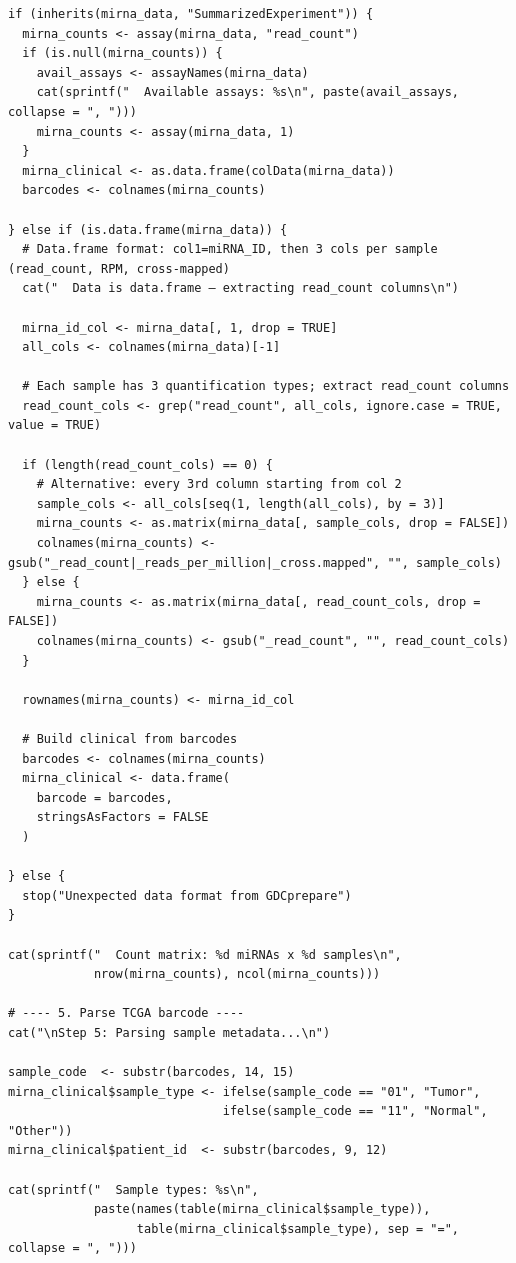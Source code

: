 \documentclass[12pt,a4paper]{ctexart}
\begin{document}
\begin{lstlisting}[caption={02_download_mirna}, basicstyle=\ttfamily\scriptsize]
if (inherits(mirna_data, "SummarizedExperiment")) {
  mirna_counts <- assay(mirna_data, "read_count")
  if (is.null(mirna_counts)) {
    avail_assays <- assayNames(mirna_data)
    cat(sprintf("  Available assays: %s\n", paste(avail_assays, collapse = ", ")))
    mirna_counts <- assay(mirna_data, 1)
  }
  mirna_clinical <- as.data.frame(colData(mirna_data))
  barcodes <- colnames(mirna_counts)

} else if (is.data.frame(mirna_data)) {
  # Data.frame format: col1=miRNA_ID, then 3 cols per sample (read_count, RPM, cross-mapped)
  cat("  Data is data.frame — extracting read_count columns\n")

  mirna_id_col <- mirna_data[, 1, drop = TRUE]
  all_cols <- colnames(mirna_data)[-1]

  # Each sample has 3 quantification types; extract read_count columns
  read_count_cols <- grep("read_count", all_cols, ignore.case = TRUE, value = TRUE)

  if (length(read_count_cols) == 0) {
    # Alternative: every 3rd column starting from col 2
    sample_cols <- all_cols[seq(1, length(all_cols), by = 3)]
    mirna_counts <- as.matrix(mirna_data[, sample_cols, drop = FALSE])
    colnames(mirna_counts) <- gsub("_read_count|_reads_per_million|_cross.mapped", "", sample_cols)
  } else {
    mirna_counts <- as.matrix(mirna_data[, read_count_cols, drop = FALSE])
    colnames(mirna_counts) <- gsub("_read_count", "", read_count_cols)
  }

  rownames(mirna_counts) <- mirna_id_col

  # Build clinical from barcodes
  barcodes <- colnames(mirna_counts)
  mirna_clinical <- data.frame(
    barcode = barcodes,
    stringsAsFactors = FALSE
  )

} else {
  stop("Unexpected data format from GDCprepare")
}

cat(sprintf("  Count matrix: %d miRNAs x %d samples\n",
            nrow(mirna_counts), ncol(mirna_counts)))

# ---- 5. Parse TCGA barcode ----
cat("\nStep 5: Parsing sample metadata...\n")

sample_code  <- substr(barcodes, 14, 15)
mirna_clinical$sample_type <- ifelse(sample_code == "01", "Tumor",
                              ifelse(sample_code == "11", "Normal", "Other"))
mirna_clinical$patient_id  <- substr(barcodes, 9, 12)

cat(sprintf("  Sample types: %s\n",
            paste(names(table(mirna_clinical$sample_type)),
                  table(mirna_clinical$sample_type), sep = "=", collapse = ", ")))


\end{lstlisting}
\end{document}
